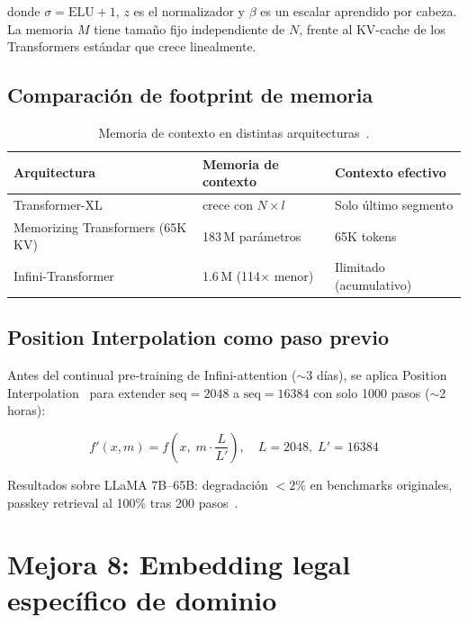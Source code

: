 \documentclass[11pt,a4paper]{article}
\begin{document}
donde $\sigma = \text{ELU}+1$, $z$ es el normalizador y $\beta$ es un escalar
aprendido por cabeza. La memoria $M$ tiene tamaño fijo independiente de $N$, frente
al KV-cache de los Transformers estándar que crece linealmente.

\subsection{Comparación de footprint de memoria}

\begin{table}[h]
\centering
\caption{Memoria de contexto en distintas arquitecturas~\citep{munkhdalai2024leave}.}
\label{tab:infini}
\begin{tabular}{lll}
\toprule
\textbf{Arquitectura} & \textbf{Memoria de contexto} & \textbf{Contexto efectivo} \\
\midrule
Transformer-XL & crece con $N \times l$ & Solo último segmento \\
Memorizing Transformers (65K KV) & 183\,M parámetros & 65K tokens \\
Infini-Transformer & 1.6\,M (114$\times$ menor) & Ilimitado (acumulativo) \\
\bottomrule
\end{tabular}
\end{table}

\subsection{Position Interpolation como paso previo}

Antes del continual pre-training de Infini-attention ($\sim$3 días), se aplica
Position Interpolation~\citep{chen2023extending} para extender $\text{seq}=2048$ a
$\text{seq}=16384$ con solo 1000 pasos ($\sim$2 horas):

\begin{equation}
  f'(x, m) = f\!\left(x,\; m \cdot \frac{L}{L'}\right), \quad L=2048,\; L'=16384
\end{equation}

Resultados sobre LLaMA 7B--65B: degradación $<2\%$ en benchmarks originales,
passkey retrieval al 100\% tras 200 pasos~\citep{chen2023extending}.

\section{Mejora 8: Embedding legal específico de dominio}
\label{sec:embed}
\end{document}
